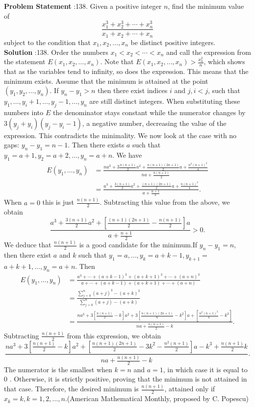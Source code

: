 \documentclass[10pt]{article}
\begin{document}
\textbf{Problem Statement} :138. Given a positive integer $n$, find the minimum value of$$ \frac{x_{1}^{3}+x_{2}^{3}+\cdots+x_{n}^{3}}{x_{1}+x_{2}+\cdots+x_{n}} $$subject to the condition that $x_{1}, x_{2}, \ldots, x_{n}$ be distinct positive integers. \\
\textbf{Solution} :138. Order the numbers $x_{1}<x_{2}<\cdots<x_{n}$ and call the expression from the statement $E\left(x_{1}, x_{2}, \ldots, x_{n}\right)$. Note that $E\left(x_{1}, x_{2}, \ldots, x_{n}\right)>\frac{x_{n}^{2}}{n}$, which shows that as the variables tend to infinity, so does the expression. This means that the minimum exists. Assume that the minimum is attained at the point $\left(y_{1}, y_{2}, \ldots, y_{n}\right)$. If $y_{n}-y_{1}>n$ then there exist indices $i$ and $j, i<j$, such that $y_{1}, \ldots, y_{i}+1, \ldots, y_{j}-1, \ldots, y_{n}$ are still distinct integers. When substituting these numbers into $E$ the denominator stays constant while the numerator changes by $3\left(y_{j}+y_{i}\right)\left(y_{j}-y_{i}-1\right)$, a negative number, decreasing the value of the expression. This contradicts the minimality. We now look at the case with no gaps: $y_{n}-y_{1}=n-1$. Then there exists $a$ such that $y_{1}=a+1, y_{2}=a+2, \ldots, y_{n}=a+n$. We have$$ \begin{aligned} E\left(y_{1}, \ldots, y_{n}\right) &=\frac{n a^{3}+3 \frac{n(n+1)}{2} a^{2}+\frac{n(n+1)(2 n+1)}{2} a+\frac{n^{2}(n+1)^{2}}{4}}{n a+\frac{n(n+1)}{2}} \\ &=\frac{a^{3}+\frac{3(n+1)}{2} a^{2}+\frac{(n+1)(2 n+1)}{2} a+\frac{n(n+1)^{2}}{4}}{a+\frac{n+1}{2}} . \end{aligned} $$When $a=0$ this is just $\frac{n(n+1)}{2}$. Subtracting this value from the above, we obtain$$ \frac{a^{3}+\frac{3(n+1)}{2} a^{2}+\left[\frac{(n+1)(2 n+1)}{2}-\frac{n(n+1)}{2}\right] a}{a+\frac{n+1}{2}}>0 . $$We deduce that $\frac{n(n+1)}{2}$ is a good candidate for the minimum.If $y_{n}-y_{1}=n$, then there exist $a$ and $k$ such that $y_{1}=a, \ldots, y_{k}=a+k-1, y_{k+1}=$ $a+k+1, \ldots, y_{n}=a+n$. Then$$ \begin{aligned} E\left(y_{1}, \ldots, y_{n}\right) &=\frac{a^{3}+\cdots+(a+k-1)^{3}+(a+k+1)^{3}+\cdots+(a+n)^{3}}{a+\cdots+(a+k-1)+(a+k+1)+\cdots+(a+n)} \\ &=\frac{\sum_{j=0}^{n}(a+j)^{3}-(a+k)^{3}}{\sum_{j=0}^{n}(a+j)-(a+k)} \\ &=\frac{n a^{3}+3\left[\frac{n(n+1)}{2}-k\right] a^{2}+3\left[\frac{n(n+1)(2 n+1)}{6}-k^{2}\right] a+\left[\frac{n^{2}(n+1)^{2}}{4}-k^{3}\right]}{n a+\frac{n(n+1)}{2}-k} . \end{aligned} $$Subtracting $\frac{n(n+1)}{2}$ from this expression, we obtain$$ \frac{n a^{3}+3\left[\frac{n(n+1)}{2}-k\right] a^{2}+\left[\frac{n(n+1)(2 n+1)}{2}-3 k^{2}-\frac{n^{2}(n+1)}{2}\right] a-k^{3}+\frac{n(n+1)}{2} k}{n a+\frac{n(n+1)}{2}-k} . $$The numerator is the smallest when $k=n$ and $a=1$, in which case it is equal to 0 . Otherwise, it is strictly positive, proving that the minimum is not attained in that case. Therefore, the desired minimum is $\frac{n(n+1)}{2}$, attained only if $x_{k}=k, k=1,2, \ldots, n$.(American Mathematical Monthly, proposed by C. Popescu)\\
\end{document}
